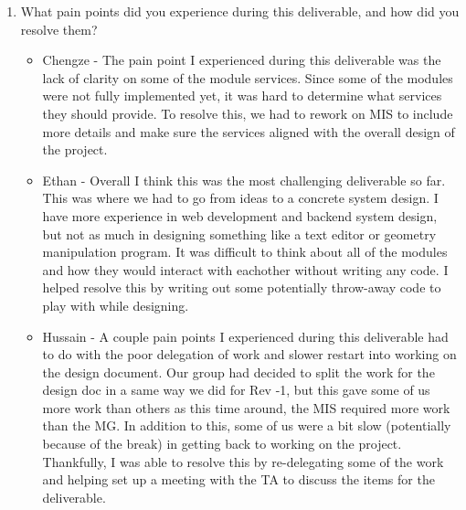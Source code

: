 \documentclass[12pt, titlepage]{article}
\begin{document}
\begin{enumerate}
\begin{itemize}
      simpler as it was already defined in the design docs. Additionally,
       having a skeleton to base the docs off of made it easier to find sections where we should have explained more to make implementation easier. 
  \end{itemize}
  \item What pain points did you experience during this deliverable, and how
    did you resolve them?
    \begin{itemize}
      \item Chengze - The pain point I experienced during this deliverable
      was the lack of clarity on some of the module services. Since some of the
      modules were not fully implemented yet, it was hard to determine what
      services they should provide. To resolve this, we had to rework on MIS to
      include more details and make sure the services aligned with the overall
      design of the project.
      \item Ethan - Overall I think this was the most challenging deliverable
        so far. This was where we had to go from ideas to a concrete system
        design. I have more experience in web development and backend system
        design, but not as much in designing something like a text editor or
        geometry manipulation program. It was difficult to think about all of
        the modules and how they would interact with eachother without writing
        any code. I helped resolve this by writing out some potentially
        throw-away code to play with while designing.
      \item Hussain - A couple pain points I experienced during this
      deliverable had to do with the poor delegation of work and slower
      restart into working on the design document. Our group had decided to
      split the work for the design doc in a same way we did for Rev -1, but
      this gave some of us more work than others as this time around, the MIS
      required more work than the MG. In addition to this, some of us were a
      bit slow (potentially because of the break) in getting back to working
      on the project. Thankfully, I was able to resolve this by re-delegating
      some of the work and helping set up a meeting with the TA to discuss
      the items for the deliverable.


\end{itemize}
\end{enumerate}
\end{document}
